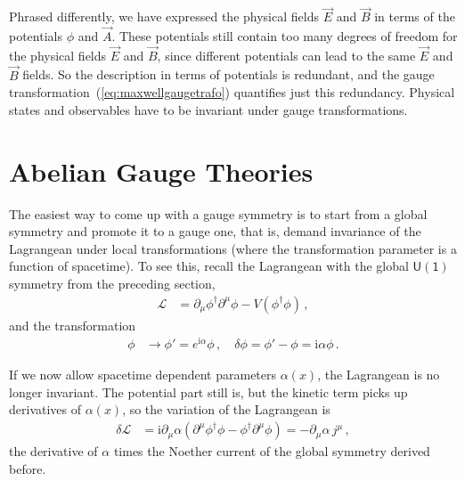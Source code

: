 \documentclass[12pt]{report}
\renewcommand{\L}{\ensuremath{\mathscr{L}}}
\renewcommand{\i}{\ensuremath{\text{i}}}
\newcommand{\2}{\ensuremath{\sqrt{2}\,}}
\renewcommand{\L}{\ensuremath{\mathscr{L}}}
\begin{document}
{      Phrased differently, we have expressed the physical fields $\vec{E}$ and $\vec{B}$ in terms 
      of the potentials $\phi$ and $\vec{A}$. These potentials still contain too many degrees of
      freedom for the
      physical fields $\vec{E}$ and $\vec{B}$, since different potentials can lead to the
      same  $\vec{E}$ and $\vec{B}$ fields. So the description in terms of potentials is
      redundant, and the gauge transformation~(\ref{eq:maxwellgaugetrafo}) quantifies just
      this redundancy. Physical states and observables have to be
      invariant under gauge transformations. 
      

    \section{Abelian Gauge Theories}
      The easiest way to come up with a gauge symmetry is to start from a global symmetry and promote
      it to a gauge one, that is, demand invariance of the Lagrangean under local
      transformations (where the transformation parameter is a function of spacetime). To see
      this, recall the Lagrangean with the global $\mathsf{U(1)}$ symmetry from the preceding
      section, 
      \begin{align*}
        \L&=\partial_\mu \phi^\dagger \partial^\mu\phi - V(\phi^\dagger\phi)\,,
      \end{align*}
      and the transformation
      \begin{align*}
        \phi&\to\phi' = e^{\i\alpha} \phi\,,\quad \delta\phi = \phi'-\phi = \i \alpha \phi\,.
      \end{align*}
      
      If we now allow spacetime dependent parameters $\alpha(x)$, the Lagrangean is no longer
      invariant. The potential part still is, but the kinetic term picks up derivatives of
      $\alpha(x)$, so the variation of the Lagrangean is
      \begin{align}
        \delta \L&= \i \partial_\mu \alpha \left(\partial^\mu\phi^\dagger \phi -\phi^\dagger
          \partial^\mu \phi\right) = -\partial_\mu\alpha \,j^\mu\,,
      \end{align}
      the derivative of $\alpha$ times the Noether current of the global symmetry derived
      before. 

}
\end{document}
